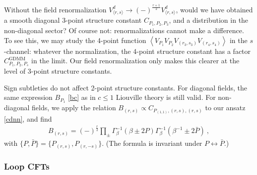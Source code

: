 \documentclass[12pt, a4paper]{article}
\theoremstyle{break}
\begin{document}
Without the field renormalization $V^d_{\langle r,s\rangle}\to (-)^{\frac{r+1}{2}} V^d_{\langle r,s\rangle}$, would we have obtained a smooth diagonal 3-point structure constant $C_{P_1,P_2,P_3}$, and a distribution in the non-diagonal sector? Of course not: renormalizations cannot make a difference. To see this, we may study the 4-point function $\left<V_{P_1}V_{P_2}V_{(r_3,s_3)}V_{(r_4,s_4)}\right>$ in the $s$-channel: whatever the normalization, the 4-point structure constant has a factor $C^\text{GDMM}_{P_1,P_2,P_s}$ in the limit. Our field renormalization only makes this clearer at the level of 3-point structure constants. 

Sign subtleties do not affect 2-point structure constants. For diagonal fields, the same expression $B_{P_1}$ \eqref{bc} as in $c\leq 1$ Liouville theory is still valid. For non-diagonal fields, we apply the relation $B_{(r,s)}\propto C_{P_{(1,1)},(r,s),(r,s)}$ to our ansatz \eqref{cdnn}, and find 
\begin{align}
 \boxed{B_{(r,s)} = (-)^\frac{r}{2} \prod_\pm \Gamma_\beta^{-1}\left(\beta\pm 2P\right)\Gamma_\beta^{-1}\left(\beta^{-1}\pm 2\bar P\right)}\ ,
 \label{nbrs}
\end{align}
with $\{P,\bar P\}=\{P_{(r,s)},P_{(r,-s)}\}$. (The formula is invariant under $P\leftrightarrow \bar P$.)

\subsubsection{Loop CFTs}
\end{document}
